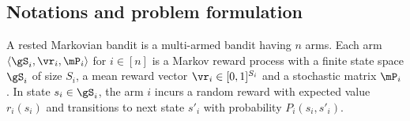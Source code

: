 
\subsection{Notations and problem formulation}
\label{ssec:rested_formul}

A rested Markovian bandit is a multi-armed bandit having $n$ arms.
Each arm $\langle\gS_i, \vr_i, \mP_i\rangle$ for $i\in[n]$ is a Markov reward process with a finite state space $\gS_i$ of size $S_i$, a mean reward vector $\vr_i\in[0,1]^{S_i}$ and a stochastic matrix $\mP_i$.
In state $s_i\in\gS_i$, the arm $i$ incurs a random reward with expected value $r_i(s_i)$ and transitions to next state $s'_i$ with probability $P_i(s_i,s'_i)$.

